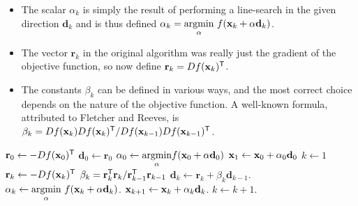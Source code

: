 \begin{itemize}
\item The scalar $\alpha_k$ is simply the result of performing a line-search in the given direction $\mathbf{d}_k$ and is thus defined $\alpha_k = \underset{\alpha}{\mbox{argmin}}\ f(\mathbf{x}_k + \alpha \mathbf{d}_k)$.
\item The vector $\mathbf{r}_k$ in the original algorithm was really just the gradient of the objective function, so now define $\mathbf{r}_k = Df(\mathbf{x}_k)^{\mathsf T}$.
\item The constants $\beta_k$ can be defined in various ways, and the most correct choice depends on the nature of the objective function.
A well-known formula, attributed to Fletcher and Reeves, is $\beta_{k} = Df(\mathbf{x}_k)Df(\mathbf{x}_{k})^{\mathsf T} / Df(\mathbf{x}_{k-1}) Df(\mathbf{x}_{k-1})^{\mathsf T}$.
\end{itemize}
%

\begin{algorithm}[H]
\begin{algorithmic}[1]
    \State $\mathbf{r}_0 \gets -Df(\mathbf{x}_0)^{\mathsf T}$
    \State $\mathbf{d}_0 \gets \mathbf{r}_0$
    \State $\alpha_0 \gets \underset{\alpha}{\mbox{argmin}} f(\mathbf{x}_0 + \alpha\mathbf{d}_0)$
    \State $\mathbf{x}_{1} \gets \mathbf{x}_0 + \alpha_0 \mathbf{d}_0$
    \State $k \gets 1$
        \State $\mathbf{r}_{k} \gets -Df(\mathbf{x}_k)^{\mathsf T}$
        \State $\beta_{k} = \mathbf{r}_{k}^{\mathsf T} \mathbf{r}_k / \mathbf{r}_{k-1}^{\mathsf T} \mathbf{r}_{k-1}$
        \State $\mathbf{d}_{k} \gets \mathbf{r}_{k} + \beta_{k}\mathbf{d}_{k-1}$.
        \State $\alpha_k \gets \underset{\alpha}{\mbox{argmin}}\ f(\mathbf{x}_k + \alpha\mathbf{d}_k)$.
        \State $\mathbf{x}_{k+1} \gets \mathbf{x}_k + \alpha_k\mathbf{d}_k$.
        \State $k \gets k+1$.
    \EndWhile
\EndProcedure
\end{algorithmic}
\caption{The Non-Linear Conjugate Gradient method (Fletcher--Reeves variant).}
\label{Alg:nonlinear-conjugate-gradient}
\end{algorithm}

